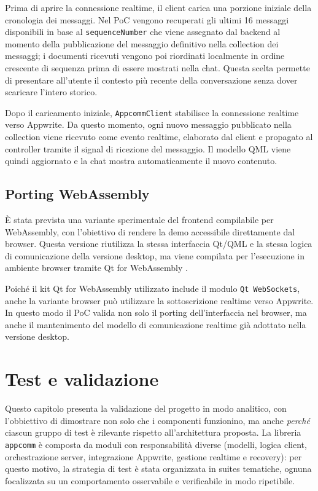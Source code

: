 \documentclass[a4paper, 11pt, twoside]{report}
\begin{document}
Prima di aprire la connessione realtime, il client carica una porzione iniziale della cronologia dei messaggi. Nel PoC vengono
recuperati gli ultimi 16 messaggi disponibili in base al \texttt{sequenceNumber} che viene assegnato dal backend al momento della pubblicazione del messaggio definitivo nella collection dei messaggi; i documenti ricevuti vengono poi riordinati localmente in ordine crescente di sequenza prima di essere mostrati nella chat. Questa scelta permette di presentare all'utente il contesto più recente della conversazione senza dover scaricare l'intero storico.

Dopo il caricamento iniziale, \texttt{AppcommClient} stabilisce la connessione realtime verso Appwrite. Da questo momento, ogni nuovo messaggio pubblicato nella collection viene ricevuto come evento realtime, elaborato dal client e propagato al controller tramite il signal di ricezione del messaggio. Il modello QML viene quindi aggiornato e la chat mostra automaticamente il nuovo contenuto.

\section{Porting WebAssembly}

È stata prevista una variante sperimentale del frontend compilabile per WebAssembly, con l'obiettivo di rendere la demo accessibile direttamente dal browser. Questa versione riutilizza la stessa interfaccia Qt/QML e la stessa logica di comunicazione della versione desktop, ma viene compilata per l'esecuzione in ambiente browser tramite Qt for WebAssembly \cite{qt_wasm}.

Poiché il kit Qt for WebAssembly utilizzato include il modulo \texttt{Qt WebSockets}, anche la variante browser può utilizzare la sottoscrizione realtime verso Appwrite. In questo modo il PoC valida non solo il porting dell'interfaccia nel browser, ma anche il mantenimento del modello di comunicazione realtime già adottato nella versione desktop.

\chapter{Test e validazione}

Questo capitolo presenta la validazione del progetto in modo analitico, con l'obbiettivo di dimostrare non solo che i componenti
funzionino, ma anche \textit{perché} ciascun gruppo di test è rilevante rispetto all'architettura proposta. La libreria 
\texttt{appcomm} è composta da moduli con responsabilità diverse (modelli, logica client, orchestrazione server, integrazione
Appwrite, gestione realtime e recovery): per questo motivo, la strategia di test è stata organizzata in suites tematiche, ognuna
focalizzata su un comportamento osservabile e verificabile in modo ripetibile.
\end{document}
